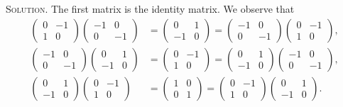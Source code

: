 \documentclass[11pt, leqno]{article}
\begin{document}
\textsc{Solution}. The first matrix is the identity matrix. We observe that 
\begin{align*}
  \begin{pmatrix} 0 & -1 \\ 1 & 0 \end{pmatrix}
  \begin{pmatrix} -1 & 0 \\ 0 & -1 \end{pmatrix}
                              &= \begin{pmatrix} 0 & 1 \\ -1 & 0 \end{pmatrix}
                                                               = \begin{pmatrix} -1 & 0 \\ 0 & -1 \end{pmatrix}
  \begin{pmatrix} 0 & -1 \\ 1 & 0 \end{pmatrix},\\
  \begin{pmatrix} -1 & 0 \\ 0 & -1 \end{pmatrix}
                                \begin{pmatrix} 0 & 1 \\ -1 & 0 \end{pmatrix}
                              &= \begin{pmatrix} 0 & -1 \\ 1 & 0 \end{pmatrix}
                                                               = \begin{pmatrix} 0 & 1 \\ -1 & 0 \end{pmatrix}
  \begin{pmatrix} -1 & 0 \\ 0 & -1 \end{pmatrix},\\
  \begin{pmatrix} 0 & 1 \\ -1 & 0 \end{pmatrix}
                                \begin{pmatrix} 0 & -1 \\ 1 & 0 \end{pmatrix}
                              &= \begin{pmatrix} 1 & 0 \\ 0 & 1 \end{pmatrix}
  = \begin{pmatrix} 0 & -1 \\ 1  & 0 \end{pmatrix} \begin{pmatrix} 0 & 1 \\ -1 & 0 \end{pmatrix}.
\end{align*}
\end{document}
